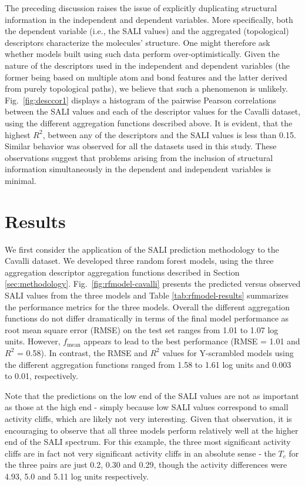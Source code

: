 \documentclass[letterpaper, 12pt]{article}
\begin{document}
The preceding discussion raises the issue of explicitly duplicating structural information in the
independent and dependent variables. More specifically, both the dependent variable (i.e., the SALI
values) and the aggregated (topological) descriptors characterize the molecules' structure. One
might therefore ask whether models built using such data perform over-optimistically. Given the
nature of the descriptors used in the independent and dependent variables (the former being based on
multiple atom and bond features and the latter derived from purely topological paths), we believe
that such a phenomenon is unlikely.  Fig.~\ref{fig:desccor1} displays a histogram of the pairwise
Pearson correlations between the SALI values and each of the descriptor values for the
Cavalli\cite{Cavalli:2002aa} dataset, using the different aggregation functions described above. It
is evident, that the highest $R^2$, between any of the descriptors and the SALI values is less than
0.15. Similar behavior was observed for all the datasets used in this study. These observations
suggest that problems arising from the inclusion of structural information simultaneously in the
dependent and independent variables is minimal.

\section{Results}
\label{sec:applications}
We first consider the application of the SALI prediction methodology to the Cavalli dataset. We
developed three random forest models, using the three aggregation descriptor aggregation functions
described in Section \ref{sec:methodology}. Fig.~\ref{fig:rfmodel-cavalli} presents the predicted
versus observed SALI values from the three models and Table \ref{tab:rfmodel-results} summarizes the
performance metrics for the three models. Overall the different aggregation functions do not differ
dramatically in terms of the final model performance as root mean square error (RMSE) on the test
set ranges from 1.01 to 1.07 log units. However, $f_{\textrm{mean}}$ appears to lead to the best
performance (RMSE = 1.01 and $R^2$ = 0.58). In contrast, the RMSE and $R^2$ values for
Y-scrambled\cite{Rucker:2007aa} models using the different aggregation functions ranged from 1.58 to
1.61 log units and 0.003 to 0.01, respectively.

Note that the predictions on the low end of the SALI values are not as important as those at the
high end - simply because low SALI values correspond to small activity cliffs, which are likely not
very interesting. Given that observation, it is encouraging to observe that all three models perform
relatively well at the higher end of the SALI spectrum. For this example, the three most significant
activity cliffs are in fact not very significant activity cliffs in an absolute sense - the $T_c$
for the three pairs are just 0.2, 0.30 and 0.29, though the activity differences were 4.93, 5.0 and
5.11 log units respectively.
\end{document}
